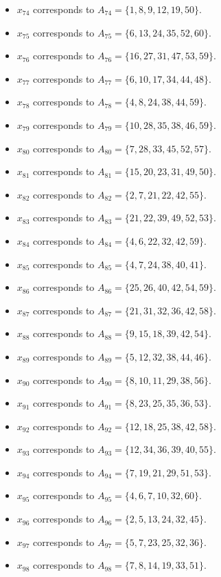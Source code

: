 \documentclass[11pt]{article}
\begin{document}
\begin{itemize}
\item $x_{74}$ corresponds to $A_{74}=\{1, 8, 9, 12, 19, 50\}$.
\item $x_{75}$ corresponds to $A_{75}=\{6, 13, 24, 35, 52, 60\}$.
\item $x_{76}$ corresponds to $A_{76}=\{16, 27, 31, 47, 53, 59\}$.
\item $x_{77}$ corresponds to $A_{77}=\{6, 10, 17, 34, 44, 48\}$.
\item $x_{78}$ corresponds to $A_{78}=\{4, 8, 24, 38, 44, 59\}$.
\item $x_{79}$ corresponds to $A_{79}=\{10, 28, 35, 38, 46, 59\}$.
\item $x_{80}$ corresponds to $A_{80}=\{7, 28, 33, 45, 52, 57\}$.
\item $x_{81}$ corresponds to $A_{81}=\{15, 20, 23, 31, 49, 50\}$.
\item $x_{82}$ corresponds to $A_{82}=\{2, 7, 21, 22, 42, 55\}$.
\item $x_{83}$ corresponds to $A_{83}=\{21, 22, 39, 49, 52, 53\}$.
\item $x_{84}$ corresponds to $A_{84}=\{4, 6, 22, 32, 42, 59\}$.
\item $x_{85}$ corresponds to $A_{85}=\{4, 7, 24, 38, 40, 41\}$.
\item $x_{86}$ corresponds to $A_{86}=\{25, 26, 40, 42, 54, 59\}$.
\item $x_{87}$ corresponds to $A_{87}=\{21, 31, 32, 36, 42, 58\}$.
\item $x_{88}$ corresponds to $A_{88}=\{9, 15, 18, 39, 42, 54\}$.
\item $x_{89}$ corresponds to $A_{89}=\{5, 12, 32, 38, 44, 46\}$.
\item $x_{90}$ corresponds to $A_{90}=\{8, 10, 11, 29, 38, 56\}$.
\item $x_{91}$ corresponds to $A_{91}=\{8, 23, 25, 35, 36, 53\}$.
\item $x_{92}$ corresponds to $A_{92}=\{12, 18, 25, 38, 42, 58\}$.
\item $x_{93}$ corresponds to $A_{93}=\{12, 34, 36, 39, 40, 55\}$.
\item $x_{94}$ corresponds to $A_{94}=\{7, 19, 21, 29, 51, 53\}$.
\item $x_{95}$ corresponds to $A_{95}=\{4, 6, 7, 10, 32, 60\}$.
\item $x_{96}$ corresponds to $A_{96}=\{2, 5, 13, 24, 32, 45\}$.
\item $x_{97}$ corresponds to $A_{97}=\{5, 7, 23, 25, 32, 36\}$.
\item $x_{98}$ corresponds to $A_{98}=\{7, 8, 14, 19, 33, 51\}$.

\end{itemize}
\end{document}
